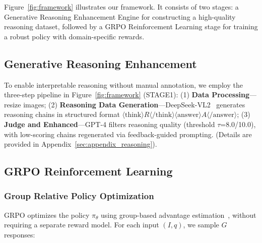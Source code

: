 \documentclass[11pt]{article}
\begin{document}
Figure~\ref{fig:framework} illustrates our framework. It consists of two stages: a Generative Reasoning Enhancement Engine for constructing a high-quality reasoning dataset, followed by a GRPO Reinforcement Learning stage for training a robust policy with domain-specific rewards.



\subsection{Generative Reasoning Enhancement}
\label{sec:cot_augmentation}

To enable interpretable reasoning without manual annotation, we employ the three-step pipeline in Figure~\ref{fig:framework} (STAGE1): (1) \textbf{Data Processing}—resize images; (2) \textbf{Reasoning Data Generation}—DeepSeek-VL2~\cite{wu2024deepseek} generates reasoning chains in structured format $\langle\text{think}\rangle R \langle/\text{think}\rangle \langle\text{answer}\rangle A \langle/\text{answer}\rangle$; (3) \textbf{Judge and Enhanced}—GPT-4 filters reasoning quality (threshold $\tau$=8.0/10.0), with low-scoring chains regenerated via feedback-guided prompting. (Details are provided in Appendix~\ref{sec:appendix_reasoning}).


\subsection{GRPO Reinforcement Learning}
\label{sec:grpo}

\subsubsection{Group Relative Policy Optimization}

GRPO optimizes the policy $\pi_\theta$ using group-based advantage estimation~\cite{zheng2025group}, without requiring a separate reward model. For each input $(I, q)$, we sample $G$ responses:
\end{document}
